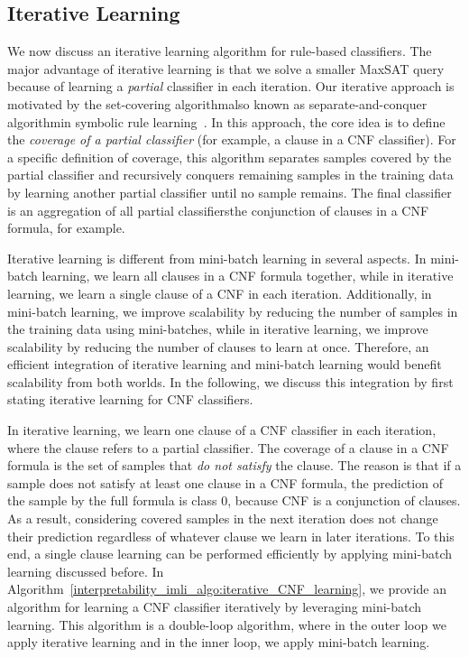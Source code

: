 \subsection{Iterative Learning}  We now discuss an iterative learning algorithm for rule-based classifiers.  The major advantage of iterative learning is that we solve a smaller MaxSAT query because of learning a \textit{partial} classifier in each iteration. Our iterative approach is motivated by the set-covering algorithm\textemdash also known as separate-and-conquer algorithm\textemdash in symbolic rule learning~\cite{furnkranz1999separate}. In this approach, the core idea is to define the \emph{coverage of a partial classifier} (for example, a clause in a CNF classifier). For a specific definition of coverage, this  algorithm separates samples covered by the partial classifier and recursively conquers remaining samples in the training data by learning another partial classifier until no sample remains. The final classifier is an aggregation of all partial classifiers\textemdash the conjunction of clauses in a CNF formula, for example. 

Iterative learning is different from mini-batch learning in several aspects. In mini-batch learning, we learn all clauses in a CNF formula together, while in iterative learning, we learn a single clause of a CNF in each iteration. Additionally, in mini-batch learning, we improve scalability by reducing the number of samples in the training data using mini-batches, while in iterative learning, we improve scalability by reducing the number of clauses to learn at once. Therefore, an efficient integration of iterative learning and mini-batch learning would benefit scalability from both worlds. In the following, we discuss this integration by first stating iterative learning for CNF classifiers.


In iterative learning, we learn one clause of a CNF classifier in each iteration, where the clause refers to a partial classifier. The coverage of a clause in a CNF formula is the set of samples that \emph{do not satisfy} the clause. The reason is that if a sample does not satisfy at least one clause in a CNF formula, the prediction of the sample by the full formula is class $ 0 $, because CNF is a conjunction of clauses. As a result, considering covered samples in the next iteration does not change their prediction regardless of whatever clause we learn in later iterations. To this end, a single clause learning can be performed efficiently by applying mini-batch learning discussed before. In Algorithm~\ref{interpretability_imli_algo:iterative_CNF_learning}, we provide an algorithm for learning a CNF classifier iteratively by leveraging mini-batch learning. This algorithm is a double-loop algorithm, where in the outer loop we apply iterative learning and in the inner loop, we apply mini-batch learning.


